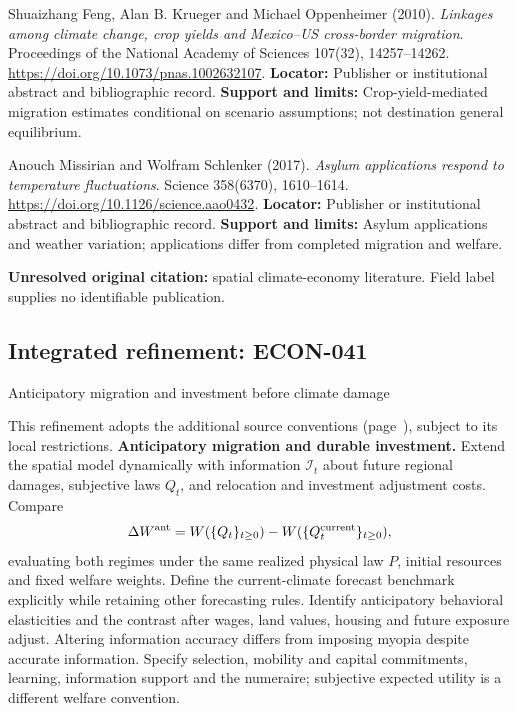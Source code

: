 \documentclass[11pt,a4paper]{article}
\begin{document}
\begin{enumerate}[label={[\textnormal{S}\arabic*]},leftmargin=*]

\item Shuaizhang Feng, Alan B. Krueger and Michael Oppenheimer (2010). \emph{Linkages among climate change, crop yields and Mexico–US cross-border migration}. Proceedings of the National Academy of Sciences 107(32), 14257–14262. \url{https://doi.org/10.1073/pnas.1002632107}. \textbf{Locator:} Publisher or institutional abstract and bibliographic record. \textbf{Support and limits:} Crop-yield-mediated migration estimates conditional on scenario assumptions; not destination general equilibrium.

\item Anouch Missirian and Wolfram Schlenker (2017). \emph{Asylum applications respond to temperature fluctuations}. Science 358(6370), 1610–1614. \url{https://doi.org/10.1126/science.aao0432}. \textbf{Locator:} Publisher or institutional abstract and bibliographic record. \textbf{Support and limits:} Asylum applications and weather variation; applications differ from completed migration and welfare.

\item \textbf{Unresolved original citation:} spatial climate-economy literature. Field label supplies no identifiable publication.

\end{enumerate}

\subsection*{Integrated refinement: ECON-041}
{\sffamily\small\color{muted}Anticipatory migration and investment before climate damage\par}
This refinement adopts the additional source conventions
(page~\pageref{audited:conventions}), subject to its local restrictions.
\textbf{Anticipatory migration and durable investment.}
Extend the spatial model dynamically with information $\mathcal I_t$ about future
regional damages, subjective laws $Q_t$, and relocation and investment adjustment
costs. Compare
\[
\Delta W^{\rm ant}=W(\{Q_t\}_{t\geq0})
                  -W(\{Q_t^{\rm current}\}_{t\geq0}),
\]
evaluating both regimes under the same realized physical law $P$, initial
resources and fixed welfare weights. Define the current-climate forecast
benchmark explicitly while retaining other forecasting rules. Identify
anticipatory behavioral elasticities and the contrast after wages, land values,
housing and future exposure adjust. Altering information accuracy differs from
imposing myopia despite accurate information. Specify selection, mobility and
capital commitments, learning, information support and the numeraire; subjective
expected utility is a different welfare convention.
\end{document}
